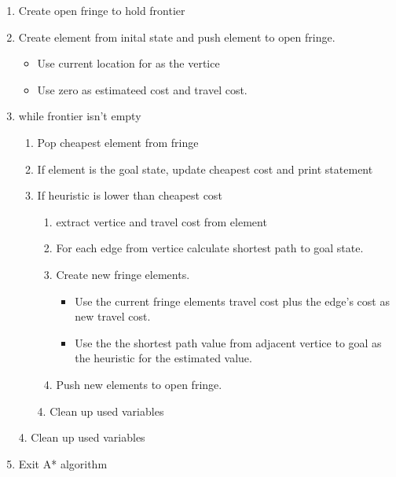 \begin{enumerate}
\item Create open fringe to hold frontier
\item Create element from inital state and push element to open fringe.
\begin{itemize}
\item Use current location for as the vertice
\item Use zero as estimateed cost and travel cost.
\end{itemize}
\item while frontier isn't empty
\begin{enumerate}
	\item Pop cheapest element from fringe
	\item If element is the goal state, update cheapest cost and print statement
	\item If heuristic is lower than cheapest cost
	\begin{enumerate}
		\item extract vertice and travel cost from element
		\item For each edge from vertice calculate shortest path to goal state.
		\item Create new fringe elements.
		\begin{itemize}
			\item Use the current fringe elements travel cost plus the edge's cost as 
				new travel cost.
			\item Use the the shortest path value from adjacent vertice to goal as the
			heuristic for the estimated value.
		\end{itemize}
		\item Push new elements to open fringe.
	\end{enumerate}
\item[4.] Clean up used variables
\end{enumerate}
\item[4.] Clean up used variables
\item Exit A* algorithm
\end{enumerate}

